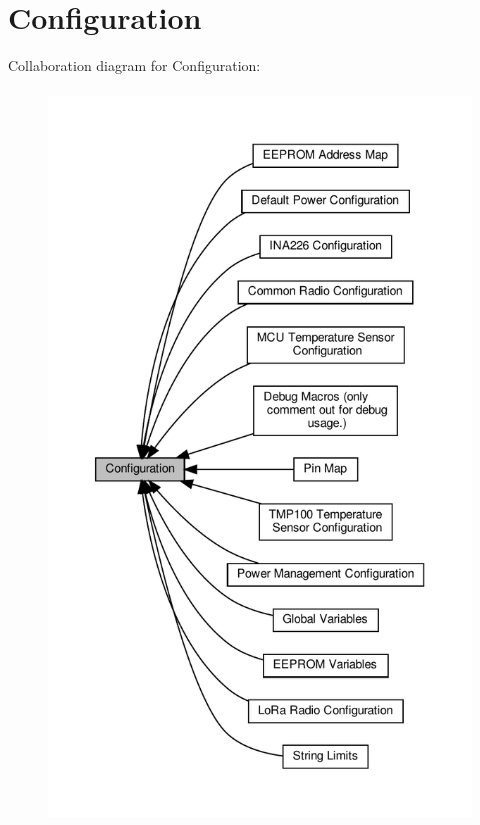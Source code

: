 \hypertarget{group__configuration__page}{}\section{Configuration}
\label{group__configuration__page}
Collaboration diagram for Configuration\+:
\nopagebreak
\begin{figure}[H]
\begin{center}
\leavevmode
\includegraphics[height=550pt]{group__configuration__page}
\end{center}
\end{figure}
